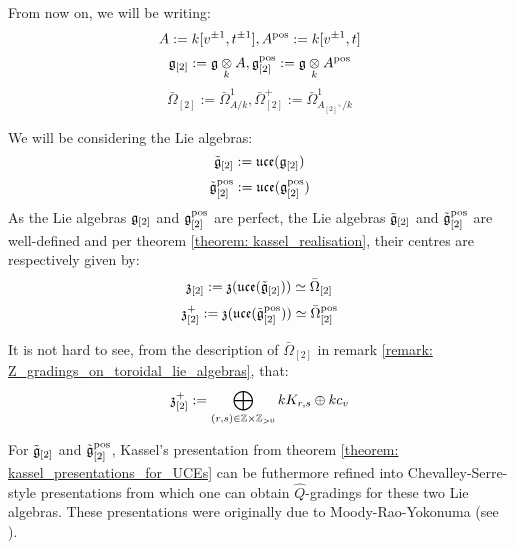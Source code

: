        \begin{convention}
            From now on, we will be writing:
                $$A := k[v^{\pm 1}, t^{\pm 1}], A^{\mathrm{pos}} := k[v^{\pm 1}, t]$$
                $$\g_{[2]} := \g \tensor_k A, \g_{[2]}^{\positive} := \g \tensor_k A^{\positive}$$
                $$\bar{\Omega}_{[2]} := \bar{\Omega}^1_{A/k}, \bar{\Omega}^+_{[2]} := \bar{\Omega}^1_{A_{[2]^+}/k}$$

            We will be considering the Lie algebras:
                $$\tilde{\mathfrak{g}}_{[2]} := \mathfrak{uce}(\mathfrak{g}_{[2]})$$
                $$\tilde{\mathfrak{g}}_{[2]}^{\mathrm{pos}} := \mathfrak{uce}(\mathfrak{g}_{[2]}^{\mathrm{pos}})$$
            As the Lie algebras $\mathfrak{g}_{[2]}$ and $\mathfrak{g}_{[2]}^{\mathrm{pos}}$ are perfect, the Lie algebras $\tilde{\mathfrak{g}}_{[2]}$ and $\tilde{\mathfrak{g}}_{[2]}^{\mathrm{pos}}$ are well-defined and per theorem \ref{theorem: kassel_realisation}, their centres are respectively given by:
                $$\mathfrak{z}_{[2]} := \mathfrak{z}(\mathfrak{uce}(\tilde{\mathfrak{g}}_{[2]})) \simeq \bar{\Omega}_{[2]}$$
                $$\mathfrak{z}_{[2]}^+ := \mathfrak{z}(\mathfrak{uce}(\tilde{\mathfrak{g}}_{[2]}^{\mathrm{pos}})) \simeq \bar{\Omega}_{[2]}^{\mathrm{pos}}$$
        \end{convention}
        \begin{remark}
            It is not hard to see, from the description of $\bar{\Omega}_{[2]}$ in remark \ref{remark: Z_gradings_on_toroidal_lie_algebras}, that:
                $$\z_{[2]}^+ := \bigoplus_{(r, s) \in \Z \x \Z_{> 0}} k K_{r, s} \oplus k c_v$$
        \end{remark}
        For $\tilde{\mathfrak{g}}_{[2]}$ and $\tilde{\mathfrak{g}}_{[2]}^{\mathrm{pos}}$, Kassel's presentation from theorem \ref{theorem: kassel_presentations_for_UCEs} can be futhermore refined into Chevalley-Serre-style presentations from which one can obtain $\hat{Q}$-gradings for these two Lie algebras. These presentations were originally due to Moody-Rao-Yokonuma (see \cite{moody_rao_yokonuma_vertex_representations_of_toroidal_lie_algebras}). 
